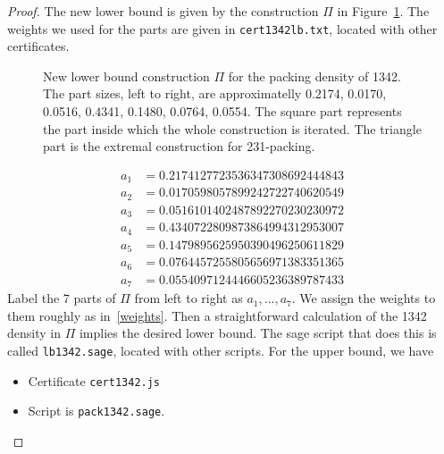 \begin{proof}
The new lower bound is given by the construction $\Pi$ in Figure~\ref{fig:pack1342}. The weights we used for the parts are given in \texttt{cert1342lb.txt}, located with other certificates.
\begin{figure}[ht]
\centering
{}
\caption{\small New lower bound construction $\Pi$ for the packing density of 1342. The part sizes, left to right, are approximatelly 0.2174, 0.0170, 0.0516, 0.4341, 0.1480, 0.0764, 0.0554. The square part represents the part inside which the whole construction is iterated. The triangle part is the extremal construction for 231-packing.}
\label{fig:pack1342}
\end{figure}

\begin{equation}
\begin{aligned}
a_1 &= 0.2174127723536347308692444843\\
a_2 &= 0.0170598057899242722740620549\\
a_3 &= 0.0516101402487892270230230972\\
a_4 &= 0.4340722809873864994312953007\\
a_5 &= 0.1479895625950390496250611829\\
a_6 &= 0.0764457255805656971383351365\\
a_7 &= 0.0554097124446605236389787433
\label{weights}
\end{aligned}
\end{equation}
Label the 7 parts of $\Pi$ from left to right as $a_1,\ldots,a_7$. We assign the weights to them roughly as in~\eqref{weights}. Then a straightforward calculation of the 1342 density in $\Pi$ implies the desired lower bound. The sage script that does this is called \texttt{lb1342.sage}, located with other scripts. For the upper bound, we have
\begin{itemize}
\item Certificate \texttt{cert1342.js}
\item Script is \texttt{pack1342.sage}.
\end{itemize}
\end{proof}

